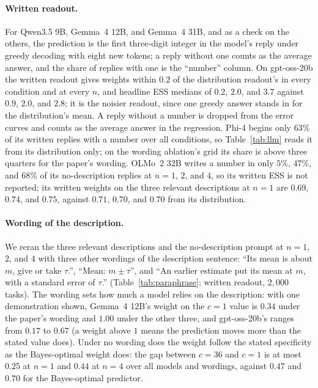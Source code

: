 \documentclass{article}
\begin{document}
\paragraph{Written readout.} For Qwen3.5 9B, Gemma~4 12B, and Gemma~4 31B, and as a check on the others, the prediction is the first three-digit integer in the model's reply under greedy decoding with eight new tokens; a reply without one counts as the average answer, and the share of replies with one is the ``number'' column. On gpt-oss-20b the written readout gives weights within $0.2$ of the distribution readout's in every condition and at every $n$, and headline ESS medians of $0.2$, $2.0$, and $3.7$ against $0.9$, $2.0$, and $2.8$; it is the noisier readout, since one greedy answer stands in for the distribution's mean. A reply without a number is dropped from the error curves and counts as the average answer in the regression. Phi-4 begins only $63\%$ of its written replies with a number over all conditions, so Table~\ref{tab:llm} reads it from its distribution only; on the wording ablation's grid its share is above three quarters for the paper's wording. OLMo~2 32B writes a number in only $5\%$, $47\%$, and $68\%$ of its no-description replies at $n = 1$, $2$, and $4$, so its written ESS is not reported; its written weights on the three relevant descriptions at $n = 1$ are $0.69$, $0.74$, and $0.75$, against $0.71$, $0.70$, and $0.70$ from its distribution.

\paragraph{Wording of the description.} We reran the three relevant descriptions and the no-description prompt at $n = 1$, $2$, and $4$ with three other wordings of the description sentence: ``Its mean is about $m$, give or take $\tau$.'', ``Mean: $m \pm \tau$'', and ``An earlier estimate put its mean at $m$, with a standard error of $\tau$.'' (Table~\ref{tab:paraphrase}; written readout, $2{,}000$ tasks). The wording sets how much a model relies on the description: with one demonstration shown, Gemma~4 12B's weight on the $c = 1$ value is $0.34$ under the paper's wording and $1.00$ under the other three, and gpt-oss-20b's ranges from $0.17$ to $0.67$ (a weight above $1$ means the prediction moves more than the stated value does). Under no wording does the weight follow the stated specificity as the Bayes-optimal weight does: the gap between $c = 36$ and $c = 1$ is at most $0.25$ at $n = 1$ and $0.44$ at $n = 4$ over all models and wordings, against $0.47$ and $0.70$ for the Bayes-optimal predictor.
\end{document}
